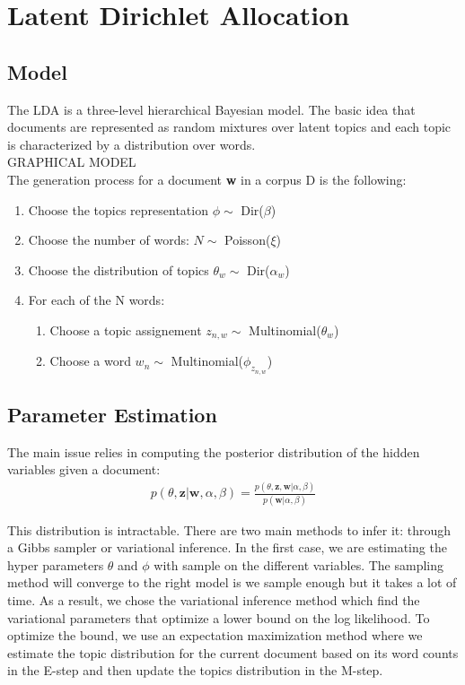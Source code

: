 \documentclass[paper=a4, fontsize=11pt]{scrartcl} %
\numberwithin{equation}{section}
\numberwithin{figure}{section}
\numberwithin{table}{section}
\begin{document}
\section{Latent Dirichlet Allocation}

\subsection*{Model}

The LDA is a three-level hierarchical Bayesian model. The basic idea that documents are represented as random mixtures over latent topics and each topic is characterized by a distribution over words.\\

GRAPHICAL MODEL\\


The generation process for a document \textbf{w} in a corpus D is the following:
\begin{enumerate}
	\item Choose the topics representation $\phi \sim$ Dir($\beta$)
	\item Choose the number of words: $ N \sim $ Poisson($ \xi $)
	\item Choose the distribution of topics $\theta_w \sim$ Dir($\alpha_w$)
	\item For each of the N words:
	\begin{enumerate}
		\item Choose a topic assignement $z_{n,w} \sim$ Multinomial($\theta_w$)
		\item Choose a word $w_n \sim$ Multinomial($\phi_{z_{n,w}}$)
	\end{enumerate}
\end{enumerate}

\subsection*{Parameter Estimation}

The main issue relies in computing the posterior distribution of the hidden variables given a document: 
\begin{align*}
p(\theta, \mathbf{z} |\mathbf{w}, \alpha, \beta) = \frac{p(\theta, \mathbf{z}, \mathbf{w} | \alpha, \beta)}{p(\mathbf{w} | \alpha, \beta)}
\end{align*}

This distribution is intractable. There are two main methods to infer it: through a Gibbs sampler or variational inference. In the first case, we are estimating the hyper parameters $\theta$ and $\phi$ with sample on the different variables. The sampling method will converge to the right model is we sample enough but it takes a lot of time. As a result, we chose the variational inference method which find the variational parameters that optimize a lower bound on the log likelihood. To optimize the bound, we use an expectation maximization method where we estimate the topic distribution for the current document based on its word counts in the E-step and then update the topics distribution in the M-step. \\
\end{document}
